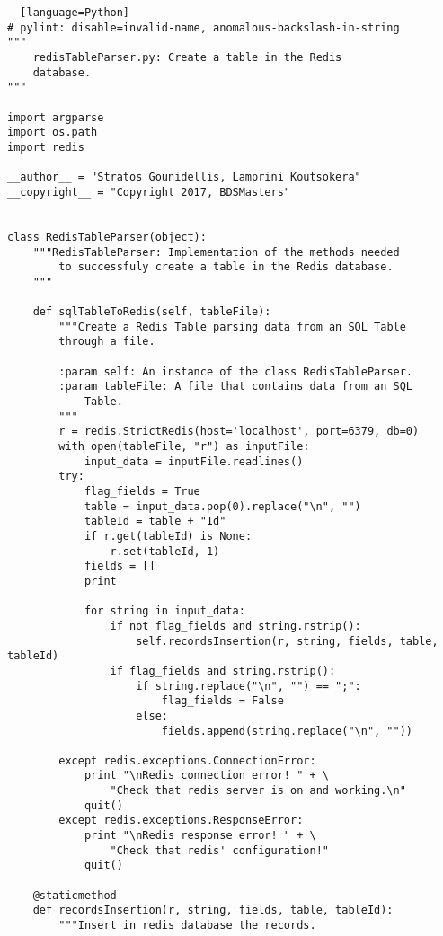 \documentclass[11pt]{article}
\begin{document}
\begin{lstlisting}  [language=Python]
# pylint: disable=invalid-name, anomalous-backslash-in-string
"""
    redisTableParser.py: Create a table in the Redis
    database.
"""

import argparse
import os.path
import redis

__author__ = "Stratos Gounidellis, Lamprini Koutsokera"
__copyright__ = "Copyright 2017, BDSMasters"


class RedisTableParser(object):
    """RedisTableParser: Implementation of the methods needed
        to successfuly create a table in the Redis database.
    """

    def sqlTableToRedis(self, tableFile):
        """Create a Redis Table parsing data from an SQL Table
        through a file.

        :param self: An instance of the class RedisTableParser.
        :param tableFile: A file that contains data from an SQL
            Table.
        """
        r = redis.StrictRedis(host='localhost', port=6379, db=0)
        with open(tableFile, "r") as inputFile:
            input_data = inputFile.readlines()
        try:
            flag_fields = True
            table = input_data.pop(0).replace("\n", "")
            tableId = table + "Id"
            if r.get(tableId) is None:
                r.set(tableId, 1)
            fields = []
            print

            for string in input_data:
                if not flag_fields and string.rstrip():
                    self.recordsInsertion(r, string, fields, table, tableId)
                if flag_fields and string.rstrip():
                    if string.replace("\n", "") == ";":
                        flag_fields = False
                    else:
                        fields.append(string.replace("\n", ""))

        except redis.exceptions.ConnectionError:
            print "\nRedis connection error! " + \
                "Check that redis server is on and working.\n"
            quit()
        except redis.exceptions.ResponseError:
            print "\nRedis response error! " + \
                "Check that redis' configuration!"
            quit()

    @staticmethod
    def recordsInsertion(r, string, fields, table, tableId):
        """Insert in redis database the records.


\end{lstlisting}
\end{document}
